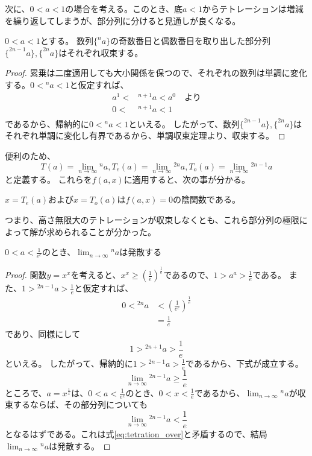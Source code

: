 	次に、$0 < a < 1$の場合を考える。このとき、底$a < 1$からテトレーションは増減を繰り返してしまうが、部分列に分けると見通しが良くなる。
	\begin{lemma}
		$0 < a < 1$とする。
		数列$\{^n a\}$の奇数番目と偶数番目を取り出した部分列$\{^{2n-1} a\},\{^{2n} a\}$はそれぞれ収束する。
	\end{lemma}
	\begin{proof}
	
		累乗は二度適用しても大小関係を保つので、それぞれの数列は単調に変化する。$0 < {^n a} < 1$と仮定すれば、
		\begin{align*}
			a^1<&{^{n+1} a}<a^0 \quad \text{より}\\
			0<&{^{n+1} a}<1 \\
		\end{align*}
		であるから、帰納的に$0 < {^n a} < 1$といえる。
		したがって、数列$\{^{2n-1} a\},\{^{2n} a\}$はそれぞれ単調に変化し有界であるから、単調収束定理より、収束する。
	\end{proof}

	便利のため、
	\[
		T(a) = \lim_{n \to \infty} {^n a},
		T_e(a) = \lim_{n \to \infty} {^{2n} a},
		T_o(a) = \lim_{n \to \infty} {^{2n - 1} a}
	\]と定義する。
	これらを$f(a,x)$に適用すると、次の事が分かる。
	\begin{theorem}
	\label{th:tetration_implicit_function}
		$x = T_e(a)$および$x = T_o(a)$は$f(a,x)=0$の陰関数である。
	\end{theorem}
	つまり、高さ無限大のテトレーションが収束しなくとも、これら部分列の極限によって解が求められることが分かった。
	
	\begin{theorem}
		$0 < a < \frac{1}{e^e}$のとき、$\displaystyle \lim_{n \to \infty} {^n a}$は発散する
	\end{theorem}
	\begin{proof}
		
		関数$y = x^x$を考えると、$x^x \geq \left( \frac{1}{e} \right)^{\frac{1}{e}}$であるので、$1 > a^a > \frac{1}{e}$である。
		また、$1 > {^{2n-1} a} > \frac{1}{e}$と仮定すれば、
		\begin{align*}
			0 < {^{2n} a} &< \left( \frac{1}{e^e} \right)^{\frac{1}{e}} \\
						  &= \frac{1}{e}
		\end{align*}
		であり、同様にして
		\[
			1 > {^{2n+1} a} > \frac{1}{e}
		\]
		といえる。
		したがって、帰納的に$1 > {^{2n-1} a} > \frac{1}{e}$であるから、下式が成立する。
		\begin{equation}
		\label{eq:tetration_over}
			\lim_{n \to \infty} {^{2n - 1} a} \geq \frac{1}{e}
		\end{equation}
		ところで、$a = x^{\frac{1}{x}}$は、$0 < a < \frac{1}{e^e}$のとき、$0 < x < \frac{1}{e}$であるから、$\displaystyle \lim_{n \to \infty} {^n a}$が収束するならば、その部分列についても
		\begin{equation*}
			\lim_{n \to \infty} {^{2n - 1} a} < \frac{1}{e}
		\end{equation*}
		となるはずである。これは式\ref{eq:tetration_over}と矛盾するので、結局$\displaystyle \lim_{n \to \infty} {^n a}$は発散する。
	\end{proof}
	
